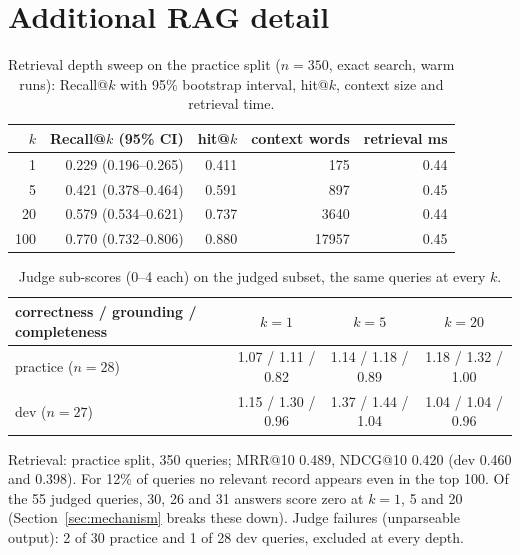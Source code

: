 \documentclass{article}
\begin{document}
\section{Additional RAG detail}
\label{app:rag}
\begin{table}[h]
\caption{Retrieval depth sweep on the practice split ($n=350$, exact search, warm runs): Recall@$k$ with 95\% bootstrap interval, hit@$k$, context size and retrieval time.}
\begin{center}
\small
\begin{tabular}{rrrrr}
\toprule
$k$ & Recall@$k$ (95\% CI) & hit@$k$ & context words & retrieval ms\\
\midrule
1 & 0.229 (0.196--0.265) & 0.411 & 175 & 0.44\\
5 & 0.421 (0.378--0.464) & 0.591 & 897 & 0.45\\
20 & 0.579 (0.534--0.621) & 0.737 & 3640 & 0.44\\
100 & 0.770 (0.732--0.806) & 0.880 & 17957 & 0.45\\
\bottomrule
\end{tabular}
\end{center}
\end{table}
\begin{table}[h]
\caption{Judge sub-scores (0--4 each) on the judged subset, the same queries at every $k$.}\label{tab:subscores}
\begin{center}
\small
\begin{tabular}{lccc}
\toprule
correctness / grounding / completeness & $k=1$ & $k=5$ & $k=20$\\
\midrule
practice ($n=28$) & 1.07 / 1.11 / 0.82 & 1.14 / 1.18 / 0.89 & 1.18 / 1.32 / 1.00\\
dev ($n=27$) & 1.15 / 1.30 / 0.96 & 1.37 / 1.44 / 1.04 & 1.04 / 1.04 / 0.96\\
\bottomrule
\end{tabular}
\end{center}
\end{table}

Retrieval: practice split, 350 queries; MRR@10 0.489, NDCG@10 0.420 (dev 0.460 and 0.398). For 12\% of queries no relevant record appears even in the top 100. Of the 55 judged queries, 30, 26 and 31 answers score zero at $k=1$, 5 and 20 (Section~\ref{sec:mechanism} breaks these down). Judge failures (unparseable output): 2 of 30 practice and 1 of 28 dev queries, excluded at every depth.

\FloatBarrier
\end{document}
